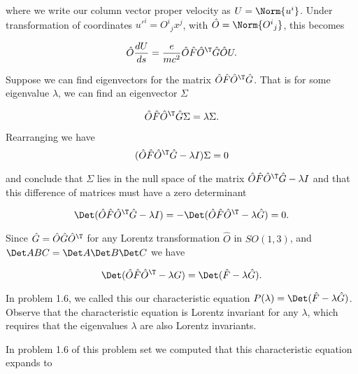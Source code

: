 where we write our column vector proper velocity as $U = \Norm{u^i}$.  Under transformation of coordinates ${u'}^i = {O^i}_j x^j$, with $\hat{O} = \Norm{{O^i}_j}$, this becomes

\begin{equation}\label{eqn:relElectroDynProblemSet3:1540}
\hat{O} \frac{d U}{ds} = \frac{e}{m c^2} \hat{O} \hat{F} \hat{O}^\T \hat{G} \hat{O} U.
\end{equation}

Suppose we can find eigenvectors for the matrix $\hat{O} \hat{F} \hat{O}^\T \hat{G}$.  That is for some eigenvalue $\lambda$, we can find an eigenvector $\Sigma$

\begin{equation}\label{eqn:relElectroDynProblemSet3:1560}
\hat{O} \hat{F} \hat{O}^\T \hat{G} \Sigma = \lambda \Sigma.
\end{equation}

Rearranging we have
\begin{equation}\label{eqn:relElectroDynProblemSet3:1580}
(\hat{O} \hat{F} \hat{O}^\T \hat{G} - \lambda I) \Sigma = 0
\end{equation}

and conclude that $\Sigma$ lies in the null space of the matrix $\hat{O} \hat{F} \hat{O}^\T \hat{G} - \lambda I$ and that this difference of matrices must have a zero determinant

\begin{equation}\label{eqn:relElectroDynProblemSet3:1600}
\Det (\hat{O} \hat{F} \hat{O}^\T \hat{G} - \lambda I) = -\Det (\hat{O} \hat{F} \hat{O}^\T - \lambda \hat{G}) = 0.
\end{equation}

Since $\hat{G} = \hat{O} \hat{G} \hat{O}^\T$ for any Lorentz transformation $\hat{O}$ in $SO(1,3)$, and $\Det ABC = \Det A \Det B \Det C$ we have

\begin{equation}\label{eqn:relElectroDynProblemSet3:1820}
\Det (\hat{O} \hat{F} \hat{O}^\T - \lambda G)
= 
\Det (\hat{F} - \lambda \hat{G}).
\end{equation}

In problem 1.6, we called this our characteristic equation $P(\lambda) = \Det (\hat{F} - \lambda \hat{G})$.  Observe that the characteristic equation is Lorentz invariant for any $\lambda$, which requires that the eigenvalues $\lambda$ are also Lorentz invariants.

In problem 1.6 of this problem set we computed that this characteristic equation expands to

